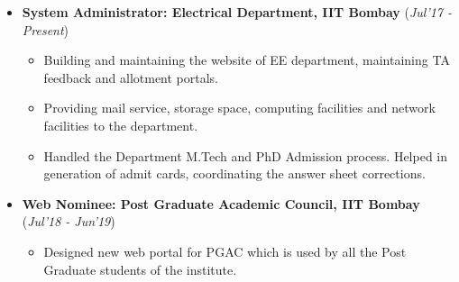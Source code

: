 \documentclass[10pt]{article}
\begin{document}
\begin{itemize}[leftmargin=0.4cm]

\item \textbf {System Administrator: Electrical Department, IIT Bombay} 
\hfill{(\textit{Jul'17 - Present})}
    \begin{itemize}
	\item Building and maintaining the website of EE department, maintaining TA feedback and allotment portals.
	\item Providing mail service, storage space, computing facilities and network facilities to the department.
	\item Handled the Department M.Tech and PhD Admission process. Helped in generation of admit cards, coordinating the answer sheet corrections.
	\end{itemize}
	
	
	
\item \textbf{Web Nominee: Post Graduate Academic Council, IIT Bombay}
\hfill{(\textit{Jul'18 - Jun'19})}
    \begin{itemize}
			\item Designed new web portal for PGAC which is used by all the Post Graduate students of the institute. 	
	\end{itemize}
	
\begin{comment}
\item \textbf{Mess Secretary: Hostel-1, IIT Bombay}
\hfill{(\textit{Sep'17 - Mar'18})}
    \begin{itemize}
            \item Managed all mess related activities for a mess which catered for 250+ students with an approximate budget of 8,00,000/- per month.
		\end{itemize}
			
\end{comment}

    	
\end{itemize}


\colorbox{bl}{}
\end{document}
